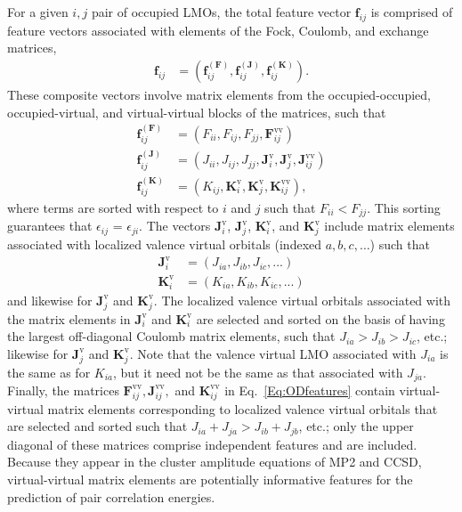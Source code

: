 \documentclass[%
 aps,
 prb,
 twocolumn,
%
 reprint,%
%
citeautoscript,
%
showkeys
]{revtex4-1}
\begin{document}
For a given $i,j$ pair of occupied LMOs, the total feature vector $\mathbf{f}_{ij}$ is comprised of feature vectors associated with elements of the Fock, Coulomb, and exchange matrices,
\begin{align}
\label{totvector}
\mathbf{f}_{ij} & = \left(\mathbf{f}_{ij}^{(\mathbf{F})}, \mathbf{f}_{ij}^{(\mathbf{J})},\mathbf{f}_{ij}^{(\mathbf{K})}\right).
\end{align} 
%
These composite vectors involve matrix elements  from the occupied-occupied, occupied-virtual, and virtual-virtual blocks of the matrices, such that 
%
%
%
%
%
\begin{align}
\label{Eq:ODfeatures}
\mathbf{f}_{ij}^{(\mathbf{F})} & = \left(F_{ii}, F_{ij}, F_{jj},\mathbf{F}^\textrm{vv}_{ij}\right) \\ 
\mathbf{f}_{ij}^{(\mathbf{J})} & = \left(J_{ii}, J_{ij}, J_{jj}, \mathbf{J}^\textrm{v}_{i}, \mathbf{J}^\textrm{v}_{j},\mathbf{J}^\textrm{vv}_{ij}\right) \nonumber\\
\mathbf{f}_{ij}^{(\mathbf{K})} & = \left(K_{ij}, \mathbf{K}^\textrm{v}_{i}, \mathbf{K}^\textrm{v}_{j}
,\mathbf{K}^\textrm{vv}_{ij}\right), \nonumber
\end{align}
 where 
 terms are sorted %
 with respect to $i$ and $j$ such that $F_{ii}<F_{jj}$. 
 This sorting guarantees that $\epsilon_{ij}$ = $\epsilon_{ji}$.
 The vectors
$\mathbf{J}^\textrm{v}_{i}$, $\mathbf{J}^\textrm{v}_{j}$, $\mathbf{K}^\textrm{v}_{i}$, and $\mathbf{K}^\textrm{v}_{j}$ %
include matrix elements associated with localized valence virtual orbitals (indexed $a,b,c,\ldots$) such that
\begin{align}
\label{EqODfeatures2}
\mathbf{J}^\textrm{v}_{i}  & = \left(J_{ia},J_{ib},J_{ic}, ... \right)\\
\mathbf{K}^\textrm{v}_{i}  & = \left(K_{ia},K_{ib},K_{ic}, ...\right) \nonumber
\end{align}
and likewise for $\mathbf{J}^\textrm{v}_{j}$ and $\mathbf{K}^\textrm{v}_{j}$.
The localized valence virtual orbitals associated with the matrix elements in $\mathbf{J}^\textrm{v}_{i}$
and $\mathbf{K}^\textrm{v}_{i}$ are selected and sorted on the basis of having the largest off-diagonal Coulomb matrix elements, %
%
such that $J_{ia}>J_{ib}>J_{ic}$, etc.; likewise for 
$\mathbf{J}^\textrm{v}_{j}$
and $\mathbf{K}^\textrm{v}_{j}$.
Note that %
the valence virtual LMO associated with $J_{ia}$ 
is the same as for $K_{ia}$, but it 
need not be the same as that associated with $J_{ja}$. %
Finally, the matrices 
$\mathbf{F}^\textrm{vv}_{ij}, \mathbf{J}^\textrm{vv}_{ij},$ and $\mathbf{K}^\textrm{vv}_{ij}$ in Eq.~\ref{Eq:ODfeatures} contain  virtual-virtual matrix elements corresponding to localized valence virtual orbitals %
that are selected and sorted such that %
%
$J_{ia}+J_{ja}>J_{ib}+J_{jb}$, etc.; only the upper diagonal of these matrices comprise independent features and are included. 
%
Because they appear in the cluster amplitude equations of MP2 and CCSD, virtual-virtual matrix elements are potentially %
informative features for the prediction of pair correlation energies.
\end{document}
